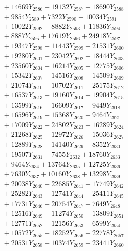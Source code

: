 \documentclass[a4paper,10pt]{article}
\begin{document}
{\begin{align}
&\;  + 14669 Y_{2586} + 19132 Y_{2587} + 18690 Y_{2588} \\[0.3ex]
&\;  + 9854 Y_{2589} + 7322 Y_{2590} + 10034 Y_{2591} \\[0.3ex]
&\;  + 10022 Y_{2592} + 8882 Y_{2593} + 11836 Y_{2594} \\[0.3ex]
&\;  + 8887 Y_{2595} + 17619 Y_{2596} + 24918 Y_{2597} \\[0.3ex]
&\;  + 19347 Y_{2598} + 11443 Y_{2599} + 21531 Y_{2600} \\[0.3ex]
&\;  + 19280 Y_{2601} + 23042 Y_{2602} + 18444 Y_{2603} \\[0.3ex]
&\;  + 23560 Y_{2604} + 16214 Y_{2605} + 12775 Y_{2606} \\[0.3ex]
&\;  + 15342 Y_{2607} + 14516 Y_{2608} + 14509 Y_{2609} \\[0.5ex]\allowbreak
&\;  + 21074 Y_{2610} + 10702 Y_{2611} + 25175 Y_{2612} \\[0.3ex]
&\;  + 16537 Y_{2613} + 19160 Y_{2614} + 19904 Y_{2615} \\[0.3ex]
&\;  + 13599 Y_{2616} + 16609 Y_{2617} + 9449 Y_{2618} \\[0.3ex]
&\;  + 16596 Y_{2619} + 15368 Y_{2620} + 9464 Y_{2621} \\[0.3ex]
&\;  + 17009 Y_{2622} + 24802 Y_{2623} + 16289 Y_{2624} \\[0.3ex]
&\;  + 21268 Y_{2625} + 12972 Y_{2626} + 15036 Y_{2627} \\[0.3ex]
&\;  + 12889 Y_{2628} + 14140 Y_{2629} + 8352 Y_{2630} \\[0.3ex]
&\;  + 19507 Y_{2631} + 7455 Y_{2632} + 18760 Y_{2633} \\[0.3ex]
&\;  + 9464 Y_{2634} + 13764 Y_{2635} + 12725 Y_{2636} \\[0.3ex]
&\;  + 7630 Y_{2637} + 10160 Y_{2638} + 13298 Y_{2639} \\[0.5ex]\allowbreak
&\;  + 20038 Y_{2640} + 22685 Y_{2641} + 17749 Y_{2642} \\[0.3ex]
&\;  + 25282 Y_{2643} + 12741 Y_{2644} + 25411 Y_{2645} \\[0.3ex]
&\;  + 17731 Y_{2646} + 20754 Y_{2647} + 7649 Y_{2648} \\[0.3ex]
&\;  + 12516 Y_{2649} + 11274 Y_{2650} + 13809 Y_{2651} \\[0.3ex]
&\;  + 12771 Y_{2652} + 12156 Y_{2653} + 6599 Y_{2654} \\[0.3ex]
&\;  + 10572 Y_{2655} + 18252 Y_{2656} + 22778 Y_{2657} \\[0.3ex]
&\;  + 20531 Y_{2658} + 10374 Y_{2659} + 23441 Y_{2660} \\[0.3ex]

\end{align}}
\end{document}
